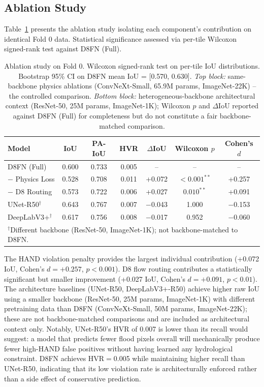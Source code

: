 \documentclass[journal]{IEEEtran}
\begin{document}
\subsection{Ablation Study}
Table~\ref{tab:ablation} presents the ablation study isolating each component's contribution on identical Fold 0 data. Statistical significance assessed via per-tile Wilcoxon signed-rank test against D8FN (Full).

\begin{table}[t]
\centering
\caption{Ablation study on Fold 0. Wilcoxon signed-rank test on per-tile IoU distributions. Bootstrap 95\% CI on D8FN mean IoU = [0.570, 0.630]. \emph{Top block:} same-backbone physics ablations (ConvNeXt-Small, 65.9M params, ImageNet-22K) -- the controlled comparison. \emph{Bottom block:} heterogeneous-backbone architectural context (ResNet-50, 25M params, ImageNet-1K); Wilcoxon $p$ and $\Delta$IoU reported against D8FN (Full) for completeness but do not constitute a fair backbone-matched comparison.}
\label{tab:ablation}
\small
\begin{tabular}{lcccccc}
\toprule
Model & IoU & PA-IoU & HVR & $\Delta$IoU & Wilcoxon $p$ & Cohen's $d$ \\
\midrule
D8FN (Full) & 0.600 & 0.733 & 0.005 & -- & -- & -- \\
$-$ Physics Loss & 0.528 & 0.708 & 0.011 & +0.072 & $<0.001^{**}$ & +0.257 \\
$-$ D8 Routing & 0.573 & 0.722 & 0.006 & +0.027 & $0.010^{**}$ & +0.091 \\
\midrule
UNet-R50$^{\dagger}$ & 0.643 & 0.767 & 0.007 & $-$0.043 & 1.000 & $-$0.153 \\
DeepLabV3+$^{\dagger}$ & 0.617 & 0.756 & 0.008 & $-$0.017 & 0.952 & $-$0.060 \\
\bottomrule
\multicolumn{7}{l}{$^{\dagger}$Different backbone (ResNet-50, ImageNet-1K); not backbone-matched to D8FN.}
\end{tabular}
\end{table}

The HAND violation penalty provides the largest individual contribution (+0.072 IoU, Cohen's $d=+0.257$, $p<0.001$). D8 flow routing contributes a statistically significant but smaller improvement (+0.027 IoU, Cohen's $d=+0.091$, $p<0.01$). The architecture baselines (UNet-R50, DeepLabV3+-R50) achieve higher raw IoU using a smaller backbone (ResNet-50, 25M params, ImageNet-1K) with different pretraining data than D8FN (ConvNeXt-Small, 50M params, ImageNet-22K); these are not backbone-matched comparisons and are included as architectural context only. Notably, UNet-R50's HVR of 0.007 is lower than its recall would suggest: a model that predicts fewer flood pixels overall will mechanically produce fewer high-HAND false positives without having learned any hydrological constraint. D8FN achieves HVR$=$0.005 while maintaining higher recall than UNet-R50, indicating that its low violation rate is architecturally enforced rather than a side effect of conservative prediction.
\end{document}
